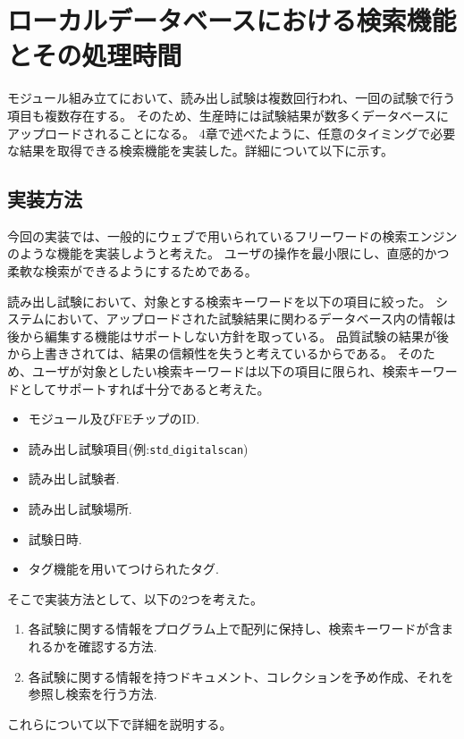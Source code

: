 \chapter{ローカルデータベースにおける検索機能とその処理時間}

モジュール組み立てにおいて、読み出し試験は複数回行われ、一回の試験で行う項目も複数存在する。
そのため、生産時には試験結果が数多くデータベースにアップロードされることになる。
4章で述べたように、任意のタイミングで必要な結果を取得できる検索機能を実装した。詳細について以下に示す。

\section{実装方法}
今回の実装では、一般的にウェブで用いられているフリーワードの検索エンジンのような機能を実装しようと考えた。
ユーザの操作を最小限にし、直感的かつ柔軟な検索ができるようにするためである。

読み出し試験において、対象とする検索キーワードを以下の項目に絞った。
システムにおいて、アップロードされた試験結果に関わるデータベース内の情報は後から編集する機能はサポートしない方針を取っている。
品質試験の結果が後から上書きされては、結果の信頼性を失うと考えているからである。
そのため、ユーザが対象としたい検索キーワードは以下の項目に限られ、検索キーワードとしてサポートすれば十分であると考えた。

\begin{itemize}
  \item モジュール及びFEチップのID.
  \item 読み出し試験項目(例:\texttt{std$\_$digitalscan})
  \item 読み出し試験者.
  \item 読み出し試験場所.
  \item 試験日時.
  \item タグ機能を用いてつけられたタグ.
\end{itemize}

そこで実装方法として、以下の2つを考えた。

\begin{enumerate}
  \item 各試験に関する情報をプログラム上で配列に保持し、検索キーワードが含まれるかを確認する方法.
  \item 各試験に関する情報を持つドキュメント、コレクションを予め作成、それを参照し検索を行う方法.
\end{enumerate}

これらについて以下で詳細を説明する。

